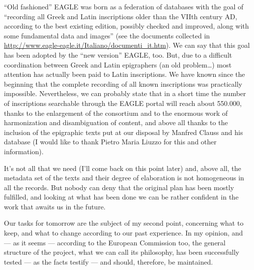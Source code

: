 ``Old fashioned'' EAGLE was born as a federation of databases with the goal of ``recording all Greek and Latin inscriptions older than the VIIth century AD, according to the best existing edition, possibly checked and improved, along with some fundamental data and images'' (see the documents collected in \url{http://www.eagle-eagle.it/Italiano/documenti_it.htm}). We can say that this goal has been adopted by the ``new version'' EAGLE, too. But, due to a difficult coordination between Greek and Latin epigraphers (an old problem…) most attention has actually been paid to Latin inscriptions. We have known since the beginning that the complete recording of all known inscriptions was practically impossible. Nevertheless, we can probably state that in a short time the number of inscriptions searchable through the EAGLE portal will reach about 550.000, thanks to the enlargement of the consortium and to the enormous work of harmonization and disambiguation of content, and above all thanks to the inclusion of the epigraphic texts put at our disposal by Manfred Clauss and his database (I would like to thank Pietro Maria Liuzzo for this and other information).

It’s not all that we need (I’ll come back on this point later) and, above all, the metadata set of the texts and their degree of elaboration is not homogeneous in all the records. But nobody can deny that the original plan has been mostly fulfilled, and looking at what has been done we can be rather confident in the work that awaits us in the future.

Our tasks for tomorrow are the subject of my second point, concerning what to keep, and what to change according to our past experience. In my opinion, and --- as it seems --- according to the European Commission too, the general structure of the project, what we can call its philosophy, has been successfully tested --- as the facts testify --- and should, therefore, be maintained. 

